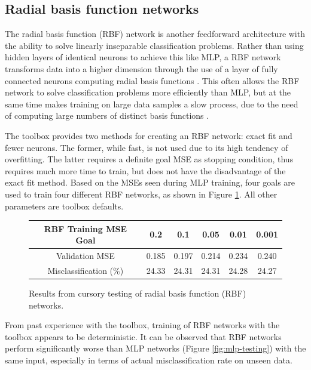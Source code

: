 \documentclass[10pt, oneside]{article}
\begin{document}
\subsection{Radial basis function networks}

The radial basis function (RBF) network is another feedforward architecture with the ability to solve linearly inseparable classification problems. Rather than using hidden layers of identical neurons to achieve this like MLP, a RBF network transforms data into a higher dimension through the use of a layer of fully connected neurons computing radial basis functions \cite{rbf-lecture}. This often allows the RBF network to solve classification problems more efficiently than MLP, but at the same time makes training on large data samples a slow process, due to the need of computing large numbers of distinct basis functions \cite[p. 260]{haykin2008}.

The toolbox provides two methods for creating an RBF network: exact fit and fewer neurons. The former, while fast, is not used due to its high tendency of overfitting. The latter requires a definite goal MSE as stopping condition, thus requires much more time to train, but does not have the disadvantage of the exact fit method. Based on the MSEs seen during MLP training, four goals are used to train four different RBF networks, as shown in Figure \ref{fig:rbf-testing}. All other parameters are toolbox defaults.

\begin{figure}[h]
\begin{center}
\fontsize{9}{11}\selectfont
\begin{tabular}{|c|c|c|c|c|c|}
\hline 
RBF Training MSE Goal & 0.2 & 0.1 & 0.05 & 0.01 & 0.001 \\ \hline \hline 
Validation MSE & 0.185 & 0.197 & 0.214 & 0.234 & 0.240 \\ \hline 
Misclassification (\%) & 24.33 & 24.31 & 24.31 & 24.28 & 24.27 \\ \hline 
\end{tabular}
\end{center}
\caption{\label{fig:rbf-testing} Results from cursory testing of radial basis function (RBF) networks.}
\end{figure}

From past experience with the toolbox, training of RBF networks with the toolbox appears to be deterministic. It can be observed that RBF networks perform significantly worse than MLP networks (Figure \ref{fig:mlp-testing}) with the same input, especially in terms of actual misclassification rate on unseen data.
\end{document}
